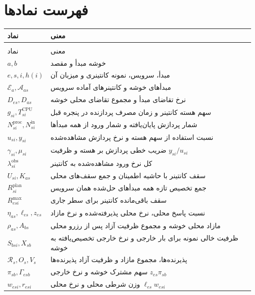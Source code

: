 \cleardoublepage
\pagestyle{style3}
\section*{\centering فهرست نمادها}
\begin{longtable}{>{\centering\arraybackslash}p{3.4cm}p{9.5cm}}
\toprule نماد & معنی \\
\midrule\endfirsthead
\multicolumn{2}{c}{ادامه فهرست نمادها}\\
\toprule نماد & معنی \\
\midrule\endhead\bottomrule\endfoot
$a,b$ & خوشه مبدأ و مقصد \\
$e,s,i,h(i)$ & مبدأ، سرویس، نمونه کانتینری و میزبان آن \\
$\mathcal E_a,\mathcal A_{as}$ & مبدأهای خوشه و کانتینرهای آماده سرویس \\
$D_{es},D_{as}$ & نرخ تقاضای مبدأ و مجموع تقاضای محلی خوشه \\
$g_{si},T^{\mathrm{CPU}}_{si}$ & سهم هسته کانتینر و زمان مصرف پردازنده در پنجره قبل \\
$N^{\mathrm{proc}}_{si},N^{\mathrm{in}}_{si}$ & شمار پردازش پایان‌یافته و شمار ورود از همه مبدأها \\
$u_{si},y_{si}$ & نسبت استفاده از سهم هسته و نرخ پردازش مشاهده‌شده \\
$\gamma_{si},\mu_{si}$ & ضریب خطی پردازش بر هسته و ظرفیت $y_{si}/u_{si}$ \\
$\lambda^{\mathrm{obs}}_{si}$ & کل نرخ ورود مشاهده‌شده به کانتینر \\
$U_{si},K_{as}$ & سقف کانتینر با حاشیه اطمینان و جمع سقف‌های محلی \\
$R^{\mathrm{plan}}_{si}$ & جمع تخصیص تازه همه مبدأهای حل‌شده همان سرویس \\
$R^{\mathrm{max}}_{esi}$ & سقف باقی‌مانده کانتینر برای سطر جاری \\
$\eta_{as},\ell_{es},z_{es}$ & نسبت پاسخ محلی، نرخ محلی پذیرفته‌شده و نرخ مازاد \\
$\rho_{as},A_{bs}$ & مازاد محلی خوشه و مجموع ظرفیت آزاد پس از رزرو محلی \\
$S_{bsi},X_{sb}$ & ظرفیت خالی نمونه برای بار خارجی و نرخ خارجی تخصیص‌یافته به خوشه \\
$\mathcal R_s,O_s,V_s$ & پذیرنده‌ها، مجموع مازاد و ظرفیت آزاد پذیرنده‌ها \\
$\pi_{sb},\Gamma_{esb}$ & سهم مشترک خوشه و نرخ خارجی $z_{es}\pi_{sb}$ \\
$w_{esi},r_{esi}$ & وزن شرطی محلی و نرخ محلی $\ell_{es}w_{esi}$ \\

\end{longtable}
